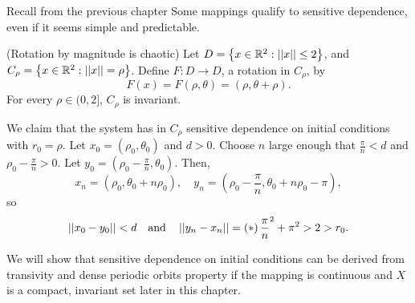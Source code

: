 \documentclass[12pt,draft,twoside]{book}
\begin{document}
Recall from the previous chapter
Some mappings qualify to sensitive dependence, even if it seems simple and predictable.
\begin{example}
  (Rotation by magnitude is chaotic)
  Let $D = \left \{ x \in \mathbb{R}^2: \left|\left| x \right|\right| \leq 2 \right \}$, and $C_\rho = \left \{ x \in \mathbb{R}^2: \left|\left| x \right|\right| = \rho \right \}$.
  Define $F: D \to D$, a rotation in $C_\rho$, by
  \begin{equation*}
    F(x) = F(\rho, \theta) = (\rho, \theta + \rho).
  \end{equation*}
  For every $\rho \in (0,2]$, $C_\rho$ is invariant.

  We claim that the system has in $C_\rho$ sensitive dependence on initial conditions with $r_0 = \rho$.
  Let $x_0 = (\rho_0, \theta_0)$ and $d > 0$.
  Choose $n$ large enough that $\frac{\pi}{n} < d$ and $\rho_0 - \frac{\pi}{n} > 0$.
  Let $y_0 = (\rho_0 - \frac{\pi}{n}, \theta_0)$.
  Then,
  \begin{equation*}
    x_n = (\rho_0, \theta_0 + n\rho_0),\quad
    y_n = (\rho_0 - \frac{\pi}{n}, \theta_0 + n\rho_0 - \pi),
  \end{equation*}
  so
  \begin{equation*}
    \left|\left| x_0 - y_0 \right|\right| < d \quad \mbox{and} \quad \left|\left| y_n - x_n \right|\right| = \left ( * \right ){\frac{\pi}{n}}^2 + \pi^2 > 2 > r_0.
  \end{equation*}
\end{example}

We will show that sensitive dependence on initial conditions can be derived from transivity and dense periodic orbits property if the mapping is continuous and $X$ is a compact, invariant set later in this chapter. \citep{banks}
\end{document}
